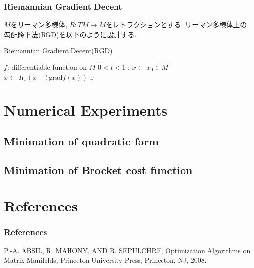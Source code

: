 \documentclass[dvipdfmx,11pt]{beamer}		%
\begin{document}
    \begin{frame}\frametitle{Riemannian Gradient Decent}
        $M$をリーマン多様体, $R : TM\to M$をレトラクションとする.
        リーマン多様体上の勾配降下法(RGD)を以下のように設計する.
        \begin{algorithm}[H]
            \caption{Riemannian Gradient Decent(RGD)}
            \begin{algorithmic}
                \REQUIRE $f$: differentiable function on $M$
                \REQUIRE $0< t <1$ : 
                \STATE $x\leftarrow x_{0}\in M$
                \STATE $x\leftarrow R_x(x - t~\mathrm{grad} f(x))$ 
                \ENDWHILE
                \RETURN $x$
            \end{algorithmic}
        \end{algorithm}
    \end{frame}
    \section{Numerical Experiments}
    \subsection{Minimation of quadratic form}
    \subsection{Minimation of Brocket cost function}

    \section*{References}
    \begin{frame}\frametitle{References}
        \begin{thebibliography}{9}
            \beamertemplatetextbibitems
             P.-A. ABSIL, R. MAHONY, AND R. SEPULCHRE, Optimization Algorithms on Matrix Manifolds, 
                       Princeton University Press, Princeton, NJ, 2008.
	    \end{thebibliography}
    \end{frame}
\end{document}
